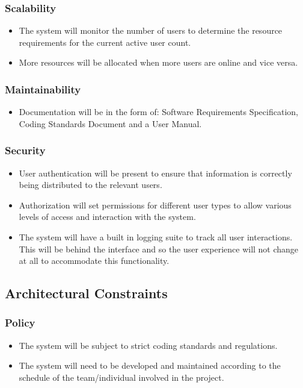\documentclass[11pt]{article}
\begin{document}
    \subsubsection{Scalability}
    \begin{itemize}
        \item The system will monitor the number of users to determine the resource requirements for the current active user count.
        \item More resources will be allocated when more users are online and vice versa.
    \end{itemize}
    \subsubsection{Maintainability}
    \begin{itemize}
        \item Documentation will be in the form of: Software Requirements Specification, Coding Standards Document and a User Manual.
    \end{itemize}
    \subsubsection{Security}
    \begin{itemize}
        \item User authentication will be present to ensure that information is correctly being distributed to the relevant users.
        \item Authorization will set permissions for different user types to allow various levels of access and interaction with the system.
        \item The system will have a built in logging suite to track all user interactions. This will be behind the interface and so the user experience will not change at all to accommodate this functionality.
    \end{itemize}
\subsection{Architectural Constraints}
    \subsubsection{Policy}
    \begin{itemize}
        \item The system will be subject to strict coding standards and regulations.
        \item The system will need to be developed and maintained according to the schedule of the team/individual involved in the project.
    \end{itemize}
\end{document}
